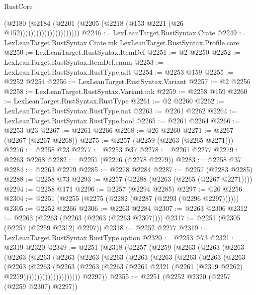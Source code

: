 \begin{lexlean}{RustCore}
\begin{coremodule}
                                  (@2180
                                    (@2184
                                      (@2201
                                        (@2205 (@2218 (@153 @2221 (@26 @152))))))))))))))))))))))
@2246 := LexLeanTarget.RustSyntax.Crate
@2249 := LexLeanTarget.RustSyntax.Crate.mk LexLeanTarget.RustSyntax.Profile.core
@2250 := LexLeanTarget.RustSyntax.ItemDef
@2251 := @2 @2250
@2252 := LexLeanTarget.RustSyntax.ItemDef.enum
@2253 := LexLeanTarget.RustSyntax.RustType.adt
@2254 := @2253 @159
@2255 := @2252 @2254
@2256 := LexLeanTarget.RustSyntax.Variant
@2257 := @2 @2256
@2258 := LexLeanTarget.RustSyntax.Variant.mk
@2259 := @2258 @159
@2260 := LexLeanTarget.RustSyntax.RustType
@2261 := @2 @2260
@2262 := LexLeanTarget.RustSyntax.RustType.nat
@2263 := @2261 @2262
@2264 := LexLeanTarget.RustSyntax.RustType.bool
@2265 := @2261 @2264
@2266 := @2253 @23
@2267 := @2261 @2266
@2268 := @26 @2260
@2271 := @2267 (@2267 (@2267 @2268))
@2275 := @2257 (@2259 (@2263 (@2265 @2271)))
@2276 := @2258 @23
@2277 := @2253 @37
@2278 := @2261 @2277
@2279 := @2263 @2268
@2282 := @2257 (@2276 (@2278 @2279))
@2283 := @2258 @37
@2284 := @2263 @2279
@2285 := @2278 @2284
@2287 := @2257 (@2283 @2285)
@2288 := @2258 @73
@2293 := @2257 (@2288 (@2263 (@2265 (@2267 @2271))))
@2294 := @2258 @171
@2296 := @2257 (@2294 @2285)
@2297 := @26 @2256
@2304 := @2251 (@2255 (@2275 (@2282 (@2287 (@2293 (@2296 @2297))))))
@2305 := @2252 @2266
@2306 := @2263 @2284
@2307 := @2263 @2306
@2312 := @2263 (@2263 (@2263 (@2263 (@2263 @2307))))
@2317 := @2251 (@2305 (@2257 (@2259 @2312) @2297))
@2318 := @2252 @2277
@2319 := LexLeanTarget.RustSyntax.RustType.option
@2320 := @2253 @73
@2321 := @2319 @2320
@2349 := @2251
    (@2318
      (@2257
        (@2259
          (@2263
            (@2263
              (@2263
                (@2263
                  (@2263
                    (@2263
                      (@2263
                        (@2263
                          (@2263
                            (@2263
                              (@2263
                                (@2263
                                  (@2263
                                    (@2263
                                      (@2263
                                        (@2263
                                          (@2263
                                            (@2263
                                              (@2261
                                                @2321
                                                (@2261 (@2319 @2262) @2279)))))))))))))))))))))
        @2297))
@2355 := @2251 (@2252 @2320 (@2257 (@2259 @2307) @2297))

\end{coremodule}
\end{lexlean}
